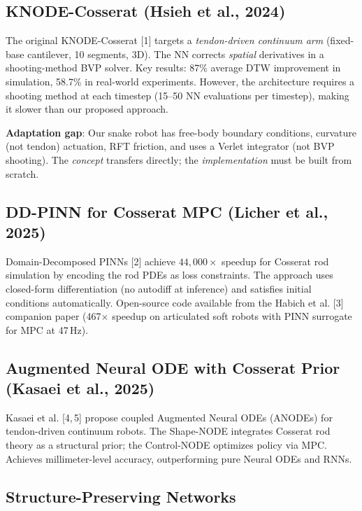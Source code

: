 \documentclass[11pt]{article}
\begin{document}
\subsection{KNODE-Cosserat (Hsieh et al., 2024)}

The original KNODE-Cosserat [1] targets a \emph{tendon-driven continuum arm} (fixed-base cantilever, 10 segments, 3D).
The NN corrects \emph{spatial} derivatives in a shooting-method BVP solver.
Key results: 87\% average DTW improvement in simulation, 58.7\% in real-world experiments.
However, the architecture requires a shooting method at each timestep (15--50 NN evaluations per timestep), making it slower than our proposed approach.

\textbf{Adaptation gap}: Our snake robot has free-body boundary conditions, curvature (not tendon) actuation, RFT friction, and uses a Verlet integrator (not BVP shooting).
The \emph{concept} transfers directly; the \emph{implementation} must be built from scratch.

\subsection{DD-PINN for Cosserat MPC (Licher et al., 2025)}

Domain-Decomposed PINNs [2] achieve $44{,}000\times$ speedup for Cosserat rod simulation by encoding the rod PDEs as loss constraints.
The approach uses closed-form differentiation (no autodiff at inference) and satisfies initial conditions automatically.
Open-source code available from the Habich et al. [3] companion paper (467$\times$ speedup on articulated soft robots with PINN surrogate for MPC at 47\,Hz).

\subsection{Augmented Neural ODE with Cosserat Prior (Kasaei et al., 2025)}

Kasaei et al. [4,\,5] propose coupled Augmented Neural ODEs (ANODEs) for tendon-driven continuum robots.
The Shape-NODE integrates Cosserat rod theory as a structural prior; the Control-NODE optimizes policy via MPC.
Achieves millimeter-level accuracy, outperforming pure Neural ODEs and RNNs.

\subsection{Structure-Preserving Networks}
\end{document}
